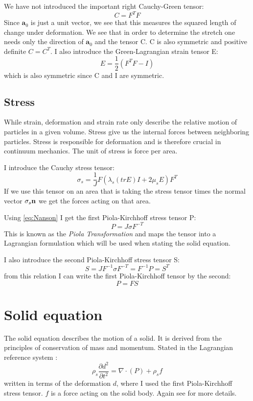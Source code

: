 We have not introduced the important right Cauchy-Green tensor:
 \begin{equation}
 C = F^TF
\end{equation}
Since $\textbf{a}_0 $ is just a unit vector, we see that this measures the squared length of change under deformation. We see that in order to determine the stretch one needs only the direction of $\textbf{a}_0$ and the tensor C.
C is also symmetric and positive definite $C = C^T$.  I also introduce the Green-Lagrangian strain tensor E:
\begin{equation}\label{eq:StrainTensor}
E = \frac{1}{2}(F^TF -I) 
\end{equation}
which is also symmetric since C and I are symmetric. 
		
\subsection{Stress}
While strain, deformation and strain rate only describe the relative motion of particles in a given volume. Stress give us the internal forces between neighboring particles. Stress is responsible for deformation and is therefore crucial in continuum mechanics. The unit of stress is force per area.

I introduce the Cauchy stress tensor:
\begin{equation}
 \sigma_s = \frac{1}{J} F(\lambda_s (tr E)I + 2\mu_sE) F^T
\end{equation}
If we use this tensor on an area that is taking the stress tensor times the normal vector $\sigma_s \bold{n}$ we get the forces acting on that area.

Using \eqref{eq:Nanson} I get the first Piola-Kirchhoff stress tensor P:
\begin{equation}
 P = J \sigma F^{-T} 
\end{equation}
This is known as the \textit{Piola Transformation} and maps the tensor into a Lagrangian formulation which will be used when stating the solid equation.

I also introduce the second Piola-Kirchhoff stress tensor S:
\begin{equation}
S = J F^{-1}\sigma F^{-T} = F^{-1} P = S^T 
\end{equation}
from this relation I can write the first Piola-Kirchhoff tensor by the second:
\begin{equation}
P = FS
\end{equation}

\section{Solid equation}
The solid equation describes the motion of a solid. It is derived from the principles of conservation of mass and momentum. Stated in the Lagrangian reference system \cite{Richter2016}:
\begin{equation}\label{eq:Solid}
\rho_s \frac{\partial d^2}{\partial t^2} = \nabla \cdot ( P ) + \rho_s f 
\end{equation}
written in terms of the deformation $d$, where I used the first Piola-Kirchhoff stress tensor. $f$ is a force acting on the solid body. Again see \cite{Holzapfel2000} for more details.

